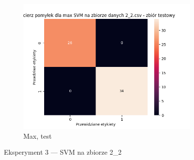 \documentclass[12pt]{article}
\newcommand*{\subfigwidth}{0.24\textwidth}
\begin{document}
\begin{figure}[H]
\begin{subfigure}[t]{\subfigwidth}
        \includegraphics[width=\linewidth]{img/exp_3/svm/2_2/max/test_matrix.png}
        \caption{Max, test}
    \end{subfigure}

    \caption{Eksperyment 3 --- SVM na zbiorze 2\_2}\label{fig:figure8}
\end{figure}
\end{document}
